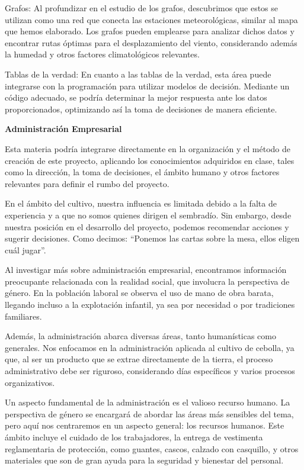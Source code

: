 \documentclass[12pt]{article}
\begin{document}
{{{{{{{	Grafos:
	Al profundizar en el estudio de los grafos, descubrimos que estos se utilizan como una red que conecta las estaciones meteorológicas, similar al mapa que hemos elaborado. Los grafos pueden emplearse para analizar dichos datos y encontrar rutas óptimas para el desplazamiento del viento, considerando además la humedad y otros factores climatológicos relevantes.
	
	Tablas de la verdad:
	En cuanto a las tablas de la verdad, esta área puede integrarse con la programación para utilizar modelos de decisión. Mediante un código adecuado, se podría determinar la mejor respuesta ante los datos proporcionados, optimizando así la toma de decisiones de manera eficiente.
		
		\newpage
	\begin{center}
		{\huge \textbf{Administración Empresarial}}
	\end{center}
	\vspace{1cm} 
	{\large %
			Esta materia podría integrarse directamente en la organización y el método de creación de este proyecto, aplicando los conocimientos adquiridos en clase, tales como la dirección, la toma de decisiones, el ámbito humano y otros factores relevantes para definir el rumbo del proyecto.
			
			En el ámbito del cultivo, nuestra influencia es limitada debido a la falta de experiencia y a que no somos quienes dirigen el sembradío. Sin embargo, desde nuestra posición en el desarrollo del proyecto, podemos recomendar acciones y sugerir decisiones. Como decimos: “Ponemos las cartas sobre la mesa, ellos eligen cuál jugar”.
			
			Al investigar más sobre administración empresarial, encontramos información preocupante relacionada con la realidad social, que involucra la perspectiva de género. En la población laboral se observa el uso de mano de obra barata, llegando incluso a la explotación infantil, ya sea por necesidad o por tradiciones familiares.
			
			Además, la administración abarca diversas áreas, tanto humanísticas como generales. Nos enfocamos en la administración aplicada al cultivo de cebolla, ya que, al ser un producto que se extrae directamente de la tierra, el proceso administrativo debe ser riguroso, considerando días específicos y varios procesos organizativos.
			
			Un aspecto fundamental de la administración es el valioso recurso humano. La perspectiva de género se encargará de abordar las áreas más sensibles del tema, pero aquí nos centraremos en un aspecto general: los recursos humanos. Este ámbito incluye el cuidado de los trabajadores, la entrega de vestimenta reglamentaria de protección, como guantes, cascos, calzado con casquillo, y otros materiales que son de gran ayuda para la seguridad y bienestar del personal.
			
}}}}}}}}
\end{document}
